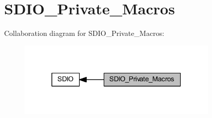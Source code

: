 \hypertarget{group___s_d_i_o___private___macros}{}\section{S\+D\+I\+O\+\_\+\+Private\+\_\+\+Macros}
\label{group___s_d_i_o___private___macros}
Collaboration diagram for S\+D\+I\+O\+\_\+\+Private\+\_\+\+Macros\+:
\nopagebreak
\begin{figure}[H]
\begin{center}
\leavevmode
\includegraphics[width=268pt]{group___s_d_i_o___private___macros}
\end{center}
\end{figure}
